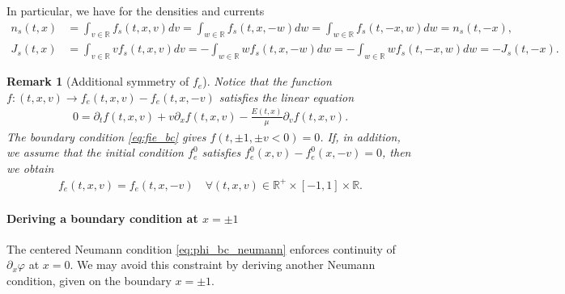 \documentclass{article}
\newtheorem{remarque}{Remark}[section]
\numberwithin{equation}{section}
\newcommand{\R}{\mathbb{R}}
\newcommand{\vv}[1]{\begin{pmatrix} #1 \end{pmatrix}} %
\begin{document}
 In particular, we have for the densities and currents 
 \begin{align*}
 	n_s (t,x) &= \int_{v\in\mathbb{R}} f_s (t,x,v) dv =  \int_{w\in\mathbb{R}} f_s (t,x,-w) dw = \int_{w\in\mathbb{R}} f_s (t,-x,w) dw = n_s (t,-x),  \\ %
 	J_s (t,x) &= \int_{v\in\mathbb{R}} v f_s (t,x,v) dv =  - \int_{w\in\mathbb{R}} w f_s (t,x,-w) dw = - \int_{w\in\mathbb{R}} w f_s (t,-x,w) dw = - J_s (t,-x).
 \end{align*}
 
 \begin{remarque}[Additional symmetry of $f_e$] Notice that the function $f : (t,x,v) \to f_e(t,x,v) - f_e(t,x,-v)$ satisfies the linear equation 
 	 \begin{align*}
 	 	0 = \partial_t f (t,x,v) + v \partial_x f (t,x,v) - \frac{E(t,x)}{\mu} \partial_v f (t,x,v). %
 	 \end{align*}
 	 The boundary condition \cref{eq:fie_bc} gives $f(t,\pm 1, \pm v < 0) = 0$. If, in addition, we assume that the initial condition $f_e^0$ satisfies $f_e^0(x,v) - f_e^0(x,-v) = 0$, then we obtain 
 	 \begin{align}\label{eq:fe_sym_v}
 	 	f_e(t,x,v) = f_e(t,x,-v) \quad \forall (t,x,v) \in \R^+ \times [-1,1] \times \mathbb{R}.
 	 \end{align}
 \end{remarque}
 
 \paragraph{Deriving a boundary condition at $x=\pm 1$}
 
 The centered Neumann condition \cref{eq:phi_bc_neumann} enforces continuity of $\partial_x \varphi$ at $x=0$. We may avoid this constraint by deriving another Neumann condition, given on the boundary $x=\pm 1$.
 
\end{document}

